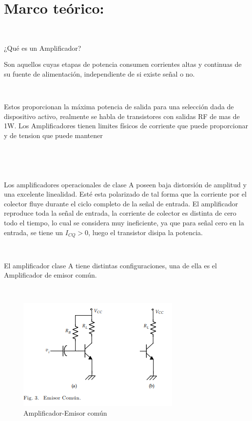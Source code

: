 \documentclass[12pt,letterpaper]{article}
\begin{document}
\section{Marco teórico:}
\

¿Qué es un Amplificador?
\

Son aquellos cuyas etapas de potencia consumen corrientes altas y continuas de su fuente de alimentación, independiente de si existe señal o no.
\

\

Estos proporcionan la máxima potencia de salida para una selección dada de dispositivo activo, realmente se habla de transistores con salidas RF de mas de 1W. Los Amplificadores tienen limites físicos de corriente que puede proporcionar y de tension que puede mantener

\

\

Los amplificadores operacionales de clase A poseen baja distorsión de amplitud y una excelente linealidad. Esté esta polarizado de tal forma que la corriente por el colector fluye durante el ciclo completo de la señal de entrada. El amplificador reproduce toda la señal de entrada, la corriente de colector es distinta de cero todo el tiempo, lo cual se considera muy ineficiente, ya que para señal cero en la entrada, se tiene un \textit{$I_{CQ}$}$>$0, luego el transistor disipa la potencia.

\

El amplificador clase A tiene distintas configuraciones, una de ella es el Amplificador de emisor común.

\

\begin{figure}[h!]
\begin{center}

\includegraphics[scale=0.8]{Emisor comun.png}
\caption{Amplificador-Emisor común}
\end{center}

\end{figure}
 
\end{document}
